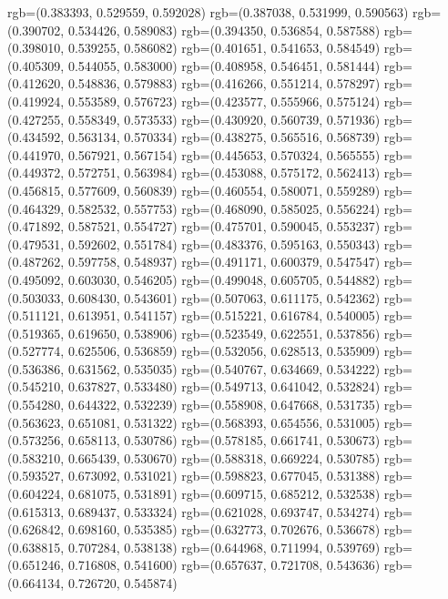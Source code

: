 {{{					rgb=(0.383393, 0.529559, 0.592028)
					rgb=(0.387038, 0.531999, 0.590563)
					rgb=(0.390702, 0.534426, 0.589083)
					rgb=(0.394350, 0.536854, 0.587588)
					rgb=(0.398010, 0.539255, 0.586082)
					rgb=(0.401651, 0.541653, 0.584549)
					rgb=(0.405309, 0.544055, 0.583000)
					rgb=(0.408958, 0.546451, 0.581444)
					rgb=(0.412620, 0.548836, 0.579883)
					rgb=(0.416266, 0.551214, 0.578297)
					rgb=(0.419924, 0.553589, 0.576723)
					rgb=(0.423577, 0.555966, 0.575124)
					rgb=(0.427255, 0.558349, 0.573533)
					rgb=(0.430920, 0.560739, 0.571936)
					rgb=(0.434592, 0.563134, 0.570334)
					rgb=(0.438275, 0.565516, 0.568739)
					rgb=(0.441970, 0.567921, 0.567154)
					rgb=(0.445653, 0.570324, 0.565555)
					rgb=(0.449372, 0.572751, 0.563984)
					rgb=(0.453088, 0.575172, 0.562413)
					rgb=(0.456815, 0.577609, 0.560839)
					rgb=(0.460554, 0.580071, 0.559289)
					rgb=(0.464329, 0.582532, 0.557753)
					rgb=(0.468090, 0.585025, 0.556224)
					rgb=(0.471892, 0.587521, 0.554727)
					rgb=(0.475701, 0.590045, 0.553237)
					rgb=(0.479531, 0.592602, 0.551784)
					rgb=(0.483376, 0.595163, 0.550343)
					rgb=(0.487262, 0.597758, 0.548937)
					rgb=(0.491171, 0.600379, 0.547547)
					rgb=(0.495092, 0.603030, 0.546205)
					rgb=(0.499048, 0.605705, 0.544882)
					rgb=(0.503033, 0.608430, 0.543601)
					rgb=(0.507063, 0.611175, 0.542362)
					rgb=(0.511121, 0.613951, 0.541157)
					rgb=(0.515221, 0.616784, 0.540005)
					rgb=(0.519365, 0.619650, 0.538906)
					rgb=(0.523549, 0.622551, 0.537856)
					rgb=(0.527774, 0.625506, 0.536859)
					rgb=(0.532056, 0.628513, 0.535909)
					rgb=(0.536386, 0.631562, 0.535035)
					rgb=(0.540767, 0.634669, 0.534222)
					rgb=(0.545210, 0.637827, 0.533480)
					rgb=(0.549713, 0.641042, 0.532824)
					rgb=(0.554280, 0.644322, 0.532239)
					rgb=(0.558908, 0.647668, 0.531735)
					rgb=(0.563623, 0.651081, 0.531322)
					rgb=(0.568393, 0.654556, 0.531005)
					rgb=(0.573256, 0.658113, 0.530786)
					rgb=(0.578185, 0.661741, 0.530673)
					rgb=(0.583210, 0.665439, 0.530670)
					rgb=(0.588318, 0.669224, 0.530785)
					rgb=(0.593527, 0.673092, 0.531021)
					rgb=(0.598823, 0.677045, 0.531388)
					rgb=(0.604224, 0.681075, 0.531891)
					rgb=(0.609715, 0.685212, 0.532538)
					rgb=(0.615313, 0.689437, 0.533324)
					rgb=(0.621028, 0.693747, 0.534274)
					rgb=(0.626842, 0.698160, 0.535385)
					rgb=(0.632773, 0.702676, 0.536678)
					rgb=(0.638815, 0.707284, 0.538138)
					rgb=(0.644968, 0.711994, 0.539769)
					rgb=(0.651246, 0.716808, 0.541600)
					rgb=(0.657637, 0.721708, 0.543636)
					rgb=(0.664134, 0.726720, 0.545874)
}}}
